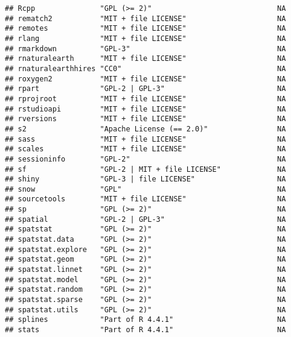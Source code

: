 \documentclass[
]{article}
\begin{document}
\begin{verbatim}
## Rcpp               "GPL (>= 2)"                             NA             
## rematch2           "MIT + file LICENSE"                     NA             
## remotes            "MIT + file LICENSE"                     NA             
## rlang              "MIT + file LICENSE"                     NA             
## rmarkdown          "GPL-3"                                  NA             
## rnaturalearth      "MIT + file LICENSE"                     NA             
## rnaturalearthhires "CC0"                                    NA             
## roxygen2           "MIT + file LICENSE"                     NA             
## rpart              "GPL-2 | GPL-3"                          NA             
## rprojroot          "MIT + file LICENSE"                     NA             
## rstudioapi         "MIT + file LICENSE"                     NA             
## rversions          "MIT + file LICENSE"                     NA             
## s2                 "Apache License (== 2.0)"                NA             
## sass               "MIT + file LICENSE"                     NA             
## scales             "MIT + file LICENSE"                     NA             
## sessioninfo        "GPL-2"                                  NA             
## sf                 "GPL-2 | MIT + file LICENSE"             NA             
## shiny              "GPL-3 | file LICENSE"                   NA             
## snow               "GPL"                                    NA             
## sourcetools        "MIT + file LICENSE"                     NA             
## sp                 "GPL (>= 2)"                             NA             
## spatial            "GPL-2 | GPL-3"                          NA             
## spatstat           "GPL (>= 2)"                             NA             
## spatstat.data      "GPL (>= 2)"                             NA             
## spatstat.explore   "GPL (>= 2)"                             NA             
## spatstat.geom      "GPL (>= 2)"                             NA             
## spatstat.linnet    "GPL (>= 2)"                             NA             
## spatstat.model     "GPL (>= 2)"                             NA             
## spatstat.random    "GPL (>= 2)"                             NA             
## spatstat.sparse    "GPL (>= 2)"                             NA             
## spatstat.utils     "GPL (>= 2)"                             NA             
## splines            "Part of R 4.4.1"                        NA             
## stats              "Part of R 4.4.1"                        NA             

\end{verbatim}
\end{document}
